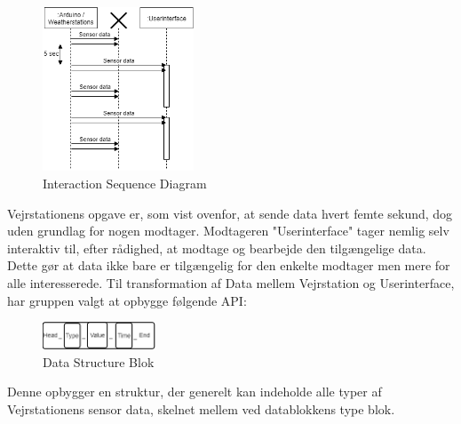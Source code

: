 \begin{figure}[H]
    \centering
    \includegraphics[width=0.4\textwidth, angle =0]{Struktureret_System_Udvikling/Workshop_2/Assets/Workshop2_SequenceDiagram.png}
    \caption{Interaction Sequence Diagram}
    \label{fig:my_label}
\end{figure}
\noindent
Vejrstationens opgave er, som vist ovenfor, at sende data hvert femte sekund, dog uden grundlag for nogen modtager. Modtageren "Userinterface" tager nemlig selv interaktiv til, efter rådighed, at modtage og bearbejde den tilgængelige data.
Dette gør at data ikke bare er tilgængelig for den enkelte modtager men mere for alle interesserede.
Til transformation af Data mellem Vejrstation og Userinterface, har gruppen valgt at opbygge følgende API:
\begin{figure}[H]
    \centering
    \includegraphics[width=0.3\textwidth, angle =0]{Struktureret_System_Udvikling/Workshop_2/Assets/Workshop2_DataStructure.png}
    \caption{Data Structure Blok}
    \label{fig:my_label}
\end{figure}
\noindent
Denne opbygger en struktur, der generelt kan indeholde alle typer af Vejrstationens sensor data, skelnet mellem ved datablokkens type blok.